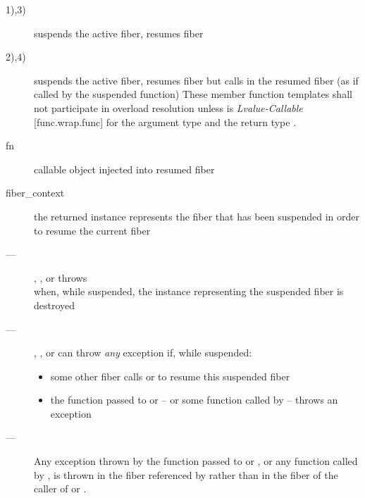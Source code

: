 \effects
\begin{description}
    \item[1),3)] suspends the active fiber, resumes fiber 
    \item[2),4)] suspends the active fiber, resumes fiber 
              but calls  in the resumed fiber (as if called by the
              suspended function)
              These member function templates shall not participate in overload
              resolution unless  is \emph{Lvalue-Callable} [func.wrap.func]
              for the argument type  and the return
              type \fiber.
\end{description}

\params
\begin{description}
    \item[fn] callable object injected into resumed fiber
\end{description}

\returns
\begin{description}
    \item[fiber\_context] the returned instance represents the fiber that has been
                 suspended in order to resume the current fiber
\end{description}

\except
\begin{description}
    \item[---] \resume, \resumewith, \xtresume or \xtresumewith throws\\
              \unwindex when, while suspended, the \fiber instance representing
              the suspended fiber is destroyed
    \item[---] \resume, \resumewith, \xtresume or \xtresumewith can
              throw \emph{any} exception if, while suspended:
              \begin{itemize}
                  \item some other fiber calls \resumewith or \xtresumewith to
                        resume this suspended fiber
                  \item the function  passed to \resumewith
                        or \xtresumewith -- or some function called
                        by  -- throws an exception
              \end{itemize}
    \item[---] Any exception thrown by the function  passed
              to \resumewith or \xtresumewith, or any function called
              by , is thrown in the fiber referenced by 
              rather than in the fiber of the caller of \resumewith
              or \xtresumewith.
\end{description}

